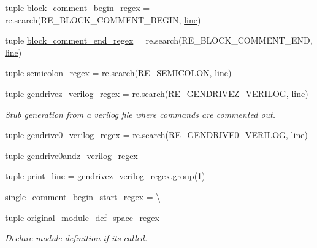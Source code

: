 \begin{DoxyCompactItemize}
tuple \hyperlink{namespaceveripy_af8e07ad7fa073c970f410a7740e03386}{block\-\_\-comment\-\_\-begin\-\_\-regex} = re.\-search(R\-E\-\_\-\-B\-L\-O\-C\-K\-\_\-\-C\-O\-M\-M\-E\-N\-T\-\_\-\-B\-E\-G\-I\-N, \hyperlink{namespaceveripy_a3cf9cf94513841f0d65d3081b08a55cc}{line})
\item 
tuple \hyperlink{namespaceveripy_aa1db3e87be026e6684d07c823dfa6e99}{block\-\_\-comment\-\_\-end\-\_\-regex} = re.\-search(R\-E\-\_\-\-B\-L\-O\-C\-K\-\_\-\-C\-O\-M\-M\-E\-N\-T\-\_\-\-E\-N\-D, \hyperlink{namespaceveripy_a3cf9cf94513841f0d65d3081b08a55cc}{line})
\item 
tuple \hyperlink{namespaceveripy_a20dab80a7e8e079a2d6d78c4dc51b972}{semicolon\-\_\-regex} = re.\-search(R\-E\-\_\-\-S\-E\-M\-I\-C\-O\-L\-O\-N, \hyperlink{namespaceveripy_a3cf9cf94513841f0d65d3081b08a55cc}{line})
\item 
tuple \hyperlink{namespaceveripy_a502cf9f0ccd059abedb0a0e98d783d56}{gendrivez\-\_\-verilog\-\_\-regex} = re.\-search(R\-E\-\_\-\-G\-E\-N\-D\-R\-I\-V\-E\-Z\-\_\-\-V\-E\-R\-I\-L\-O\-G, \hyperlink{namespaceveripy_a3cf9cf94513841f0d65d3081b08a55cc}{line})
\begin{DoxyCompactList}\small\item\em Stub generation from a verilog file where commands are commented out. \end{DoxyCompactList}\item 
tuple \hyperlink{namespaceveripy_a8d38e767dc483e41e1e69ef6e81b514f}{gendrive0\-\_\-verilog\-\_\-regex} = re.\-search(R\-E\-\_\-\-G\-E\-N\-D\-R\-I\-V\-E0\-\_\-\-V\-E\-R\-I\-L\-O\-G, \hyperlink{namespaceveripy_a3cf9cf94513841f0d65d3081b08a55cc}{line})
\item 
tuple \hyperlink{namespaceveripy_a59d33ef53803dc897114e47da6616883}{gendrive0andz\-\_\-verilog\-\_\-regex}
\item 
tuple \hyperlink{namespaceveripy_a842c59e3665a101ff8d4813809eae3ff}{print\-\_\-line} = gendrivez\-\_\-verilog\-\_\-regex.\-group(1)
\item 
\hyperlink{namespaceveripy_a314fe1312fbb83c74fb29a23eb5dd7b2}{single\-\_\-comment\-\_\-begin\-\_\-start\-\_\-regex} = \textbackslash{}
\item 
tuple \hyperlink{namespaceveripy_ac72c2df33623add620128261218cd038}{original\-\_\-module\-\_\-def\-\_\-space\-\_\-regex}
\begin{DoxyCompactList}\small\item\em Declare module definition if its called. \end{DoxyCompactList}\item 

\end{DoxyCompactItemize}
